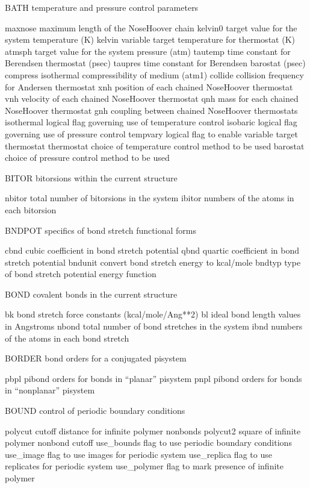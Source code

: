 \documentclass[letterpaper,11pt,english]{sphinxmanual}
\begin{document}
BATH    temperature and pressure control parameters

maxnose maximum length of the Nose\sphinxhyphen{}Hoover chain
kelvin0 target value for the system temperature (K)
kelvin  variable target temperature for thermostat (K)
atmsph  target value for the system pressure (atm)
tautemp time constant for Berendsen thermostat (psec)
taupres time constant for Berendsen barostat (psec)
compress        isothermal compressibility of medium (atm\sphinxhyphen{}1)
collide collision frequency for Andersen thermostat
xnh     position of each chained Nose\sphinxhyphen{}Hoover thermostat
vnh     velocity of each chained Nose\sphinxhyphen{}Hoover thermostat
qnh     mass for each chained Nose\sphinxhyphen{}Hoover thermostat
gnh     coupling between chained Nose\sphinxhyphen{}Hoover thermostats
isothermal      logical flag governing use of temperature control
isobaric        logical flag governing use of pressure control
tempvary        logical flag to enable variable target thermostat
thermostat      choice of temperature control method to be used
barostat        choice of pressure control method to be used

BITOR   bitorsions within the current structure

nbitor  total number of bitorsions in the system
ibitor  numbers of the atoms in each bitorsion

BNDPOT  specifics of bond stretch functional forms

cbnd    cubic coefficient in bond stretch potential
qbnd    quartic coefficient in bond stretch potential
bndunit convert bond stretch energy to kcal/mole
bndtyp  type of bond stretch potential energy function

BOND    covalent bonds in the current structure

bk      bond stretch force constants (kcal/mole/Ang**2)
bl      ideal bond length values in Angstroms
nbond   total number of bond stretches in the system
ibnd    numbers of the atoms in each bond stretch

BORDER  bond orders for a conjugated pisystem

pbpl    pi\sphinxhyphen{}bond orders for bonds in “planar” pisystem
pnpl    pi\sphinxhyphen{}bond orders for bonds in “nonplanar” pisystem

BOUND   control of periodic boundary conditions

polycut cutoff distance for infinite polymer nonbonds
polycut2        square of infinite polymer nonbond cutoff
use\_bounds      flag to use periodic boundary conditions
use\_image       flag to use images for periodic system
use\_replica     flag to use replicates for periodic system
use\_polymer     flag to mark presence of infinite polymer
\end{document}
